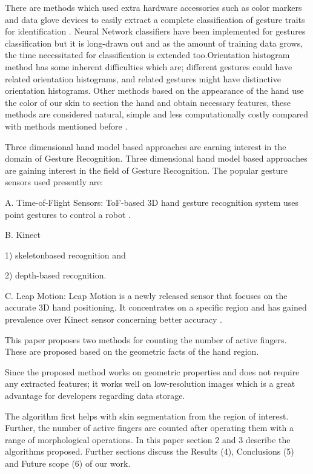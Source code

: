 \documentclass[conference]{IEEEtran}
\begin{document}
 There are methods which used extra hardware accessories such as color markers and data glove devices to easily extract a complete classification of gesture traits for identification \cite{1199054} . Neural Network classifiers have been implemented for gestures classification \cite{Murakami:1991:GRU:108844.108900} but it is long-drawn out and as the amount of training data grows, the time necessitated for classification is extended too.Orientation histogram method \cite{freeman1995orientation} has some inherent difficulties which are; different gestures could have related orientation histograms, and related gestures might have distinctive orientation histograms. Other methods based on the appearance of the hand use the color of our skin to section the hand and obtain necessary features, these methods are considered natural, simple and less computationally costly compared with methods mentioned before \cite{1199054} .

Three dimensional hand model based approaches \cite{cheng2016survey} are earning interest in the domain of Gesture Recognition.		Three dimensional hand model based approaches \cite{cheng2016survey} are gaining interest in the field of Gesture Recognition.
The popular gesture sensors used presently are:

A. Time-of-Flight Sensors:
ToF-based 3D hand gesture recognition system uses point gestures to control a robot \cite{droeschel2011learning}.

B. Kinect

 1) skeletonbased recognition \cite{shotton2013real} and 
 
 2) depth-based recognition.

C. Leap Motion: Leap Motion is a newly released sensor that focuses on the accurate 3D hand positioning. It concentrates on a specific region and has gained prevalence over Kinect sensor concerning better accuracy \cite{regenbrecht2013leap}.

This paper proposes two methods for counting the number of active fingers. These are proposed based on the geometric facts of the hand region. 

Since the proposed method works on geometric properties and does not require any extracted features; it works well on low-resolution images which is a great advantage for developers regarding data storage.

The algorithm first helps with skin segmentation from the region of interest. Further, the number of active fingers are counted after operating them with a range of morphological operations.
In this paper section 2 and 3 describe the algorithms proposed. Further sections discuss the Results (4), Conclusions (5) and Future scope (6) of our work.
\end{document}
